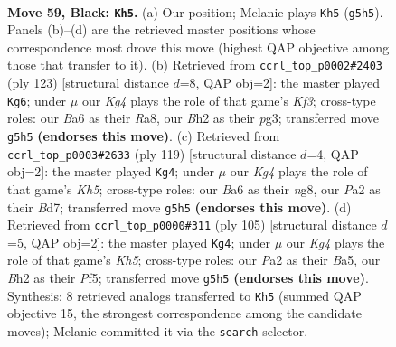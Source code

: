 \documentclass[11pt]{article}
\begin{document}
\clearpage

\begin{figure}[p]\centering
\begin{subfigure}{0.46\textwidth}\centering
\resizebox{\linewidth}{!}{%
\newchessgame
\chessboard[
  setfen={6K1/8/b5p1/6k1/8/8/p6b/8 b - - 5 59},
  showmover=false,
  pgfstyle=straightmove, color=movearrow, markmove={g5-h5}
]}
\caption{}
\end{subfigure}\hfill
\begin{subfigure}{0.46\textwidth}\centering
\resizebox{\linewidth}{!}{%
\newchessgame
\chessboard[
  setfen={r7/5p2/5k2/8/8/6P1/3R4/6K1 b - - 6 62},
  showmover=false,
  pgfstyle=straightmove, color=movearrow, markmove={f6-g6}
]}
\caption{}
\end{subfigure}
\\[4pt]
\begin{subfigure}{0.46\textwidth}\centering
\resizebox{\linewidth}{!}{%
\newchessgame
\chessboard[
  setfen={6N1/3b4/8/7p/4P2k/8/8/6K1 b - - 17 60},
  showmover=false,
  pgfstyle=straightmove, color=movearrow, markmove={h4-g4}
]}
\caption{}
\end{subfigure}\hfill
\begin{subfigure}{0.46\textwidth}\centering
\resizebox{\linewidth}{!}{%
\newchessgame
\chessboard[
  setfen={8/8/2B5/b4p1p/7k/4P3/8/5K2 b - - 0 53},
  showmover=false,
  pgfstyle=straightmove, color=movearrow, markmove={h4-g4}
]}
\caption{}
\end{subfigure}
\caption{\textbf{Move 59, Black: \texttt{Kh5}.} (a) Our position; Melanie plays \texttt{Kh5} (\texttt{g5h5}). Panels (b)--(d) are the retrieved master positions whose correspondence most drove this move (highest QAP objective among those that transfer to it). (b) Retrieved from \texttt{ccrl\_top\_p0002\#2403} (ply 123) [structural distance $d$=8, QAP obj=2]: the master played \texttt{Kg6}; under $\mu$ our \emph{Kg4} plays the role of that game's \emph{Kf3}; cross-type roles: our \emph{B}a6 as their \emph{R}a8, our \emph{B}h2 as their \emph{p}g3; transferred move \texttt{g5h5} \textbf{(endorses this move)}. (c) Retrieved from \texttt{ccrl\_top\_p0003\#2633} (ply 119) [structural distance $d$=4, QAP obj=2]: the master played \texttt{Kg4}; under $\mu$ our \emph{Kg4} plays the role of that game's \emph{Kh5}; cross-type roles: our \emph{B}a6 as their \emph{n}g8, our \emph{P}a2 as their \emph{B}d7; transferred move \texttt{g5h5} \textbf{(endorses this move)}. (d) Retrieved from \texttt{ccrl\_top\_p0000\#311} (ply 105) [structural distance $d$=5, QAP obj=2]: the master played \texttt{Kg4}; under $\mu$ our \emph{Kg4} plays the role of that game's \emph{Kh5}; cross-type roles: our \emph{P}a2 as their \emph{B}a5, our \emph{B}h2 as their \emph{P}f5; transferred move \texttt{g5h5} \textbf{(endorses this move)}. Synthesis: 8 retrieved analogs transferred to \texttt{Kh5} (summed QAP objective 15, the strongest correspondence among the candidate moves); Melanie committed it via the \texttt{search} selector.}
\label{fig:thought-m117}
\end{figure}
\end{document}
